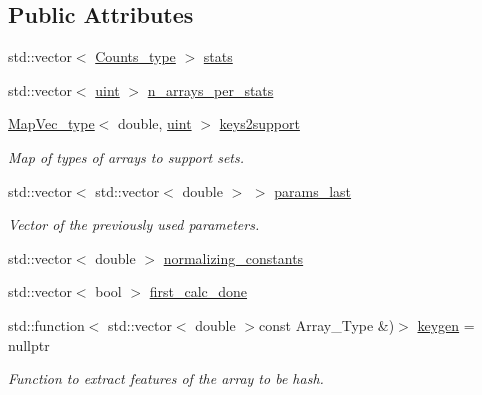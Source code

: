 \subsection*{Public Attributes}
\begin{DoxyCompactItemize}
\item 
std\+::vector$<$ \hyperlink{namespacebarry_a3e2d8c3b6cf602107559d4237d9f1315}{Counts\+\_\+type} $>$ \hyperlink{classbarry_1_1_model_a09fa1641ee40f23bad698a7c78db4b87}{stats}
\item 
std\+::vector$<$ \hyperlink{namespacebarry_a11dfc53ddb4672278319aa04f1e09a6c}{uint} $>$ \hyperlink{classbarry_1_1_model_a6e72cbb235cf592668c286931a488830}{n\+\_\+arrays\+\_\+per\+\_\+stats}
\item 
\hyperlink{namespacebarry_a2f0d3aab1d67e4c8eaeab9022e16139f}{Map\+Vec\+\_\+type}$<$ double, \hyperlink{namespacebarry_a11dfc53ddb4672278319aa04f1e09a6c}{uint} $>$ \hyperlink{classbarry_1_1_model_a802069270d02f2e2ad7e5f2adb51c2bc}{keys2support}
\begin{DoxyCompactList}\small\item\em Map of types of arrays to support sets. \end{DoxyCompactList}\item 
std\+::vector$<$ std\+::vector$<$ double $>$ $>$ \hyperlink{classbarry_1_1_model_ace8577c5c0c7bd927a2337515155ab6f}{params\+\_\+last}
\begin{DoxyCompactList}\small\item\em Vector of the previously used parameters. \end{DoxyCompactList}\item 
std\+::vector$<$ double $>$ \hyperlink{classbarry_1_1_model_a600630f5fad408c157b21404dbde4bc1}{normalizing\+\_\+constants}
\item 
std\+::vector$<$ bool $>$ \hyperlink{classbarry_1_1_model_ae7b6def02fcb353830362713490c9825}{first\+\_\+calc\+\_\+done}
\item 
std\+::function$<$ std\+::vector$<$ double $>$const Array\+\_\+\+Type \&)$>$ \hyperlink{classbarry_1_1_model_a68f7422006423a4f0a00c3e4f5d0e1d5}{keygen} = nullptr
\begin{DoxyCompactList}\small\item\em Function to extract features of the array to be hash. \end{DoxyCompactList}\end{DoxyCompactItemize}
